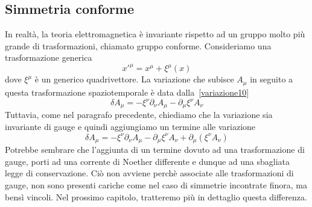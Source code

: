 \subsection{Simmetria conforme}
    In realtà, la teoria elettromagnetica è invariante rispetto ad un gruppo molto più grande di trasformazioni, chiamato gruppo conforme. Consideriamo una trasformazione generica
\begin{equation*}
    x'^\mu = x^\mu + \xi^\mu(x)
\end{equation*}
    dove $\xi^\mu$ è un generico quadrivettore. La variazione che subisce $A_\mu$ in seguito a questa trasformazione spaziotemporale è data dalla~\eqref{variazione10}
\begin{equation*}
    \delta A_\mu = - \xi^\nu \partial_\nu A_\mu - \partial_\mu \xi^\nu A_\nu
\end{equation*}
    Tuttavia, come nel paragrafo precedente, chiediamo che la variazione sia invariante di gauge e quindi aggiungiamo un termine alle variazione
\begin{equation*}
    \delta A_\mu = - \xi^\nu \partial_\nu A_\mu - \partial_\mu \xi^\nu A_\nu + \partial_\mu(\xi^\nu A_\nu)
\end{equation*}
    Potrebbe sembrare che l'aggiunta di un termine dovuto ad una trasformazione di gauge, porti ad una corrente di Noether differente e dunque ad una sbagliata legge di conservazione. Ciò non avviene perchè associate alle trasformazioni di gauge, non sono presenti cariche come nel caso di simmetrie incontrate finora, ma bensì vincoli. Nel prossimo capitolo, tratteremo più in dettaglio questa differenza. 

